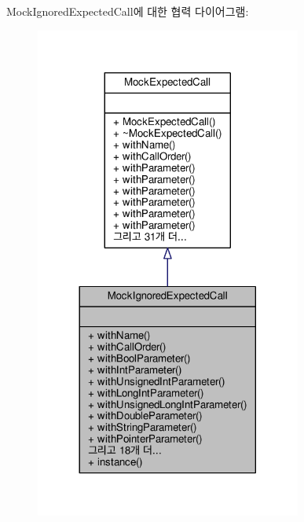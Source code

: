 Mock\+Ignored\+Expected\+Call에 대한 협력 다이어그램\+:
\nopagebreak
\begin{figure}[H]
\begin{center}
\leavevmode
\includegraphics[width=248pt]{class_mock_ignored_expected_call__coll__graph}
\end{center}
\end{figure}
